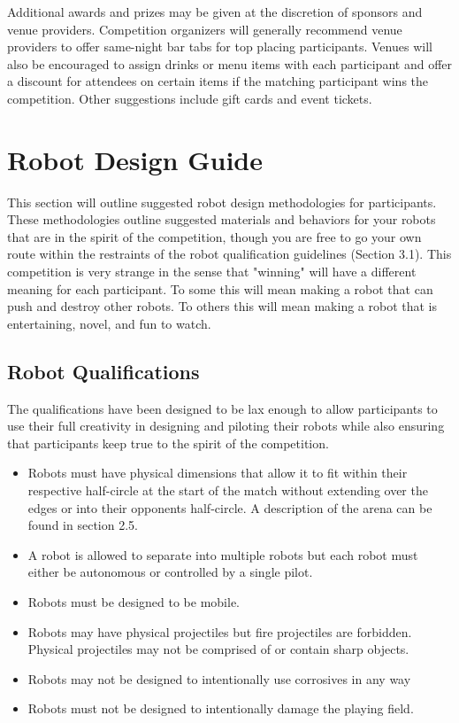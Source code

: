 \documentclass{article}
\begin{document}
Additional awards and prizes may be given at the discretion of sponsors and venue providers. Competition organizers will generally recommend venue providers to offer same-night bar tabs for top placing participants. Venues will also be encouraged to assign drinks or menu items with each participant and offer a discount for attendees on certain items if the matching participant wins the competition. Other suggestions include gift cards and event tickets.

	
\section {Robot Design Guide}	

This section will outline suggested robot design methodologies for participants. These methodologies outline suggested materials and behaviors for your robots that are in the spirit of the competition, though you are free to go your own route within the restraints of the robot qualification guidelines (Section 3.1). This competition is very strange in the sense that "winning" will have a different meaning for each participant. To some this will mean making a robot that can push and destroy other robots. To others this will mean making a robot that is entertaining, novel, and fun to watch.

	\subsection {Robot Qualifications}	
				
				The qualifications have been designed to be lax enough to allow participants to use their full creativity in designing and piloting their robots while also ensuring that participants keep true to the spirit of the competition.
				
	\begin{itemize}
  			\item  Robots must have physical dimensions that allow it to fit within their respective half-circle at the start of the match without extending over the edges or into their opponents half-circle. A description of the arena can be found in section 2.5.
 			\item A robot is allowed to separate into multiple robots but each robot must either be autonomous or controlled by a single pilot.
  			\item Robots must be designed to be mobile.
 			\item Robots may have physical projectiles but fire projectiles are forbidden. Physical projectiles may
not be comprised of or contain sharp objects.
  			\item Robots may not be designed to intentionally use corrosives in any way
 			\item Robots must not be designed to intentionally damage the playing field.
		\end{itemize}
		
\end{document}
